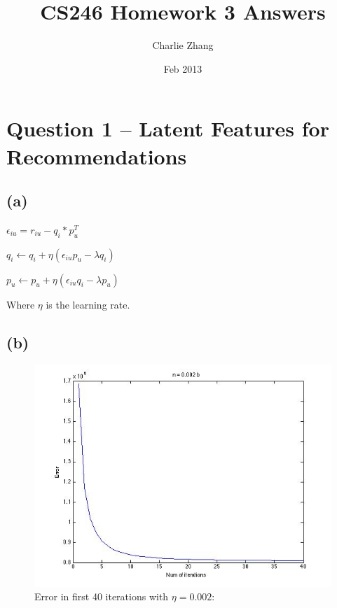 \documentclass{article}
\title{CS246 Homework 3 Answers}
\author{Charlie Zhang}
\date{Feb 2013}
\begin{document}
\maketitle
\section{Question 1 -- Latent Features for Recommendations}


\subsection{(a)}
$\epsilon_{iu} = r_{iu} - q_i * p_u^T$

$q_i \leftarrow q_i + \eta(\epsilon_{iu}p_u - \lambda q_i)$

$p_u \leftarrow p_u + \eta(\epsilon_{iu}q_i - \lambda p_u)$

Where $\eta$ is the learning rate.

\subsection{(b)}
\begin{figure}[H]
\centering
\includegraphics[scale=0.5]{EAsOfIterationEta0002.jpg}
\caption{ Error in first 40 iterations with $\eta=0.002$: }
\label{}
\end{figure}
\end{document}

